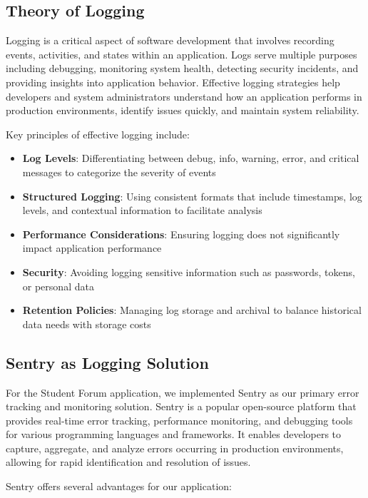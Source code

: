 \subsection{Theory of Logging}

Logging is a critical aspect of software development that involves recording events, activities, and states within an application. Logs serve multiple purposes including debugging, monitoring system health, detecting security incidents, and providing insights into application behavior. Effective logging strategies help developers and system administrators understand how an application performs in production environments, identify issues quickly, and maintain system reliability.

Key principles of effective logging include:

\begin{itemize}
    \item \textbf{Log Levels}: Differentiating between debug, info, warning, error, and critical messages to categorize the severity of events
    \item \textbf{Structured Logging}: Using consistent formats that include timestamps, log levels, and contextual information to facilitate analysis
    \item \textbf{Performance Considerations}: Ensuring logging does not significantly impact application performance
    \item \textbf{Security}: Avoiding logging sensitive information such as passwords, tokens, or personal data
    \item \textbf{Retention Policies}: Managing log storage and archival to balance historical data needs with storage costs
\end{itemize}

\subsection{Sentry as Logging Solution}

For the Student Forum application, we implemented Sentry as our primary error tracking and monitoring solution. Sentry is a popular open-source platform that provides real-time error tracking, performance monitoring, and debugging tools for various programming languages and frameworks. It enables developers to capture, aggregate, and analyze errors occurring in production environments, allowing for rapid identification and resolution of issues.

Sentry offers several advantages for our application:

